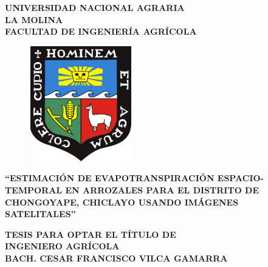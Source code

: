 \begin{titlepage}
    \centering
     {\fontsize{18pt}{ \baselineskip}\selectfont \textbf{UNIVERSIDAD NACIONAL AGRARIA}}
     \\[0.25cm]
     {\fontsize{18pt}{ \baselineskip}\selectfont \textbf{LA MOLINA}}
     \\[0.25cm]
     {\fontsize{16pt}{ \baselineskip}\selectfont \textbf{FACULTAD DE INGENIERÍA AGRÍCOLA}}
     \\[1cm]
     
    \begin{figure}[htb]
        \centering
        \includegraphics[width=4.5cm, height=5cm]{Cover/Escudo_UNALM.pdf}
    \end{figure}
    
    \vspace{0.5cm}
    
    {\fontsize{14pt}{12pt}\selectfont \textbf{``ESTIMACIÓN DE EVAPOTRANSPIRACIÓN ESPACIO-TEMPORAL EN ARROZALES PARA EL DISTRITO DE CHONGOYAPE, CHICLAYO USANDO IMÁGENES SATELITALES''}\par}
    \vspace{1cm}
    
    {\fontsize{14pt}{ \baselineskip}\selectfont \textbf{TESIS PARA OPTAR EL TÍTULO DE}}\\
    {\fontsize{14pt}{ \baselineskip}\selectfont \textbf{INGENIERO AGRÍCOLA}}
    \\[1cm]
    {\fontsize{14pt}{ \baselineskip}\selectfont \textbf{BACH. CESAR FRANCISCO VILCA GAMARRA}}\\[1cm]
    

\end{titlepage}
